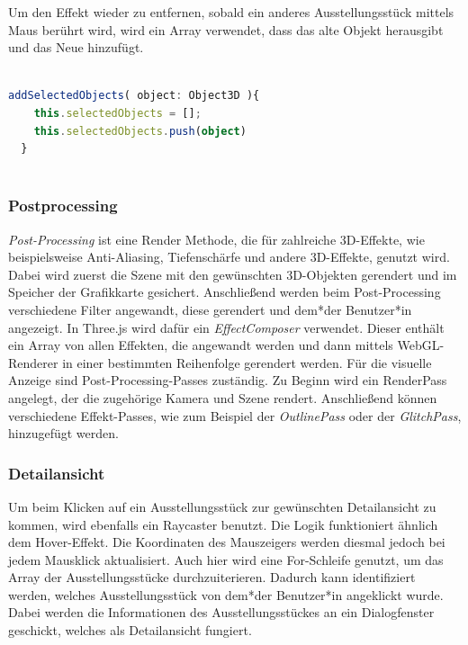 Um den Effekt wieder zu entfernen, sobald ein anderes Ausstellungsstück mittels Maus berührt wird, wird ein Array verwendet, dass das alte Objekt herausgibt und das Neue hinzufügt.

\begin{lstlisting}[caption={Hover-effekt wieder entfernen},language=TypeScript]
    
addSelectedObjects( object: Object3D ){
    this.selectedObjects = [];
    this.selectedObjects.push(object)
  }
    
\end{lstlisting}

\subsubsection{Postprocessing}
\label{Post-Processing}
\emph{Post-Processing} ist eine Render Methode, die für zahlreiche 3D-Effekte, wie beispielsweise Anti-Aliasing, Tiefenschärfe und andere 3D-Effekte, genutzt wird. Dabei wird zuerst die Szene mit den gewünschten 3D-Objekten gerendert und im Speicher der Grafikkarte gesichert. Anschließend werden beim Post-Processing verschiedene Filter angewandt, diese gerendert und dem*der Benutzer*in angezeigt. In Three.js wird dafür ein \emph{EffectComposer} verwendet. Dieser enthält ein Array von allen Effekten, die angewandt werden und dann mittels WebGL-Renderer in einer bestimmten Reihenfolge gerendert werden. Für die visuelle Anzeige sind Post-Processing-Passes zuständig. Zu Beginn wird ein RenderPass angelegt, der die zugehörige Kamera und Szene rendert. Anschließend können verschiedene Effekt-Passes, wie zum Beispiel der \emph{OutlinePass} oder der \emph{GlitchPass}, hinzugefügt werden. \cite{PostProcessing}

\subsubsection{Detailansicht}

Um beim Klicken auf ein Ausstellungsstück zur gewünschten Detailansicht zu kommen, wird ebenfalls ein Raycaster benutzt. Die Logik funktioniert ähnlich dem Hover-Effekt. Die Koordinaten des Mauszeigers werden diesmal jedoch bei jedem Mausklick aktualisiert. Auch hier wird eine For-Schleife genutzt, um das Array der Ausstellungsstücke durchzuiterieren. Dadurch kann identifiziert werden, welches Ausstellungsstück von dem*der Benutzer*in angeklickt wurde. Dabei werden die Informationen des Ausstellungsstückes an ein Dialogfenster geschickt, welches als Detailansicht fungiert.  

